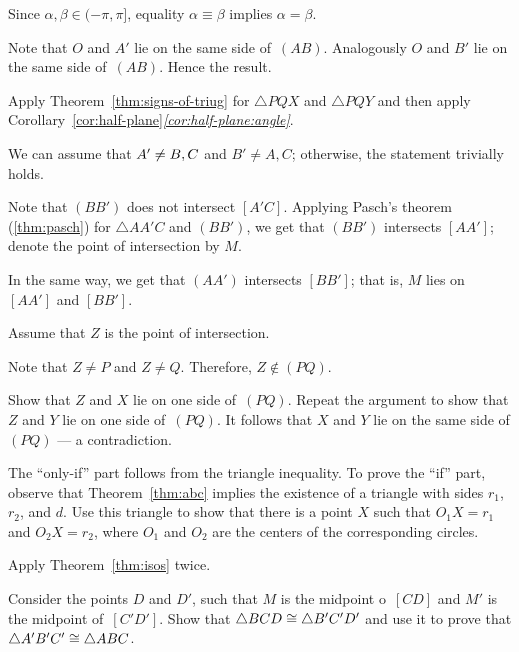 Since $\alpha,\beta\in(-\pi,\pi]$, equality $\alpha\equiv \beta$ implies $\alpha= \beta$.

Note that $O$ and $A'$
lie on the same side of~$(AB)$.
Analogously $O$ and $B'$
lie on the same side of~$(AB)$.
Hence the result.

Apply Theorem~\ref{thm:signs-of-triug} for $\triangle PQX$ and $\triangle PQY$ and then 
apply Corollary~\ref{cor:half-plane}\textit{\ref{cor:half-plane:angle}}.

We can assume that $A'\z\ne B,C$ and $B'\ne A, C$;
otherwise, the statement trivially holds.

Note that $(BB')$ does not intersect $[A'C]$.
Applying Pasch's theorem (\ref{thm:pasch}) for $\triangle AA'C$ and $(BB')$, we get that 
$(BB')$ intersects $[AA']$; denote the point of intersection by $M$.

In the same way, we get that $(AA')$ intersects $[BB']$;
that is, $M$ lies on $[AA']$ and $[BB']$.

Assume that $Z$ is the point of intersection.

Note that $Z\ne P$ and $Z\ne Q$.
Therefore, $Z\notin (PQ)$.

Show that $Z$ and $X$ lie on one side of~$(PQ)$.
Repeat the argument to show that $Z$ and $Y$ lie on one side of~$(PQ)$.
It follows that $X$ and $Y$ lie on the same side of $(PQ)$ --- a contradiction.

 The ``only-if'' part follows from the triangle inequality.
To prove the ``if'' part,  
observe that Theorem~\ref{thm:abc} implies the existence of a triangle with sides $r_1$, $r_2$, and $d$.
Use this triangle to show that there is a point $X$ such that $O_1X=r_1$ and $O_2X=r_2$, where $O_1$ and $O_2$ are the centers of the corresponding circles.



\setcounter{eqtn}{0}

Apply Theorem~\ref{thm:isos} twice.

Consider the points $D$ and $D'$, such that 
$M$ is the midpoint o~$[CD]$
and 
$M'$ is the midpoint of~$[C'D']$.
Show that $\triangle BCD\z\cong \triangle B'C'D'$ and use it to prove that $\triangle A' B' C'\z\cong\triangle A B C$.

